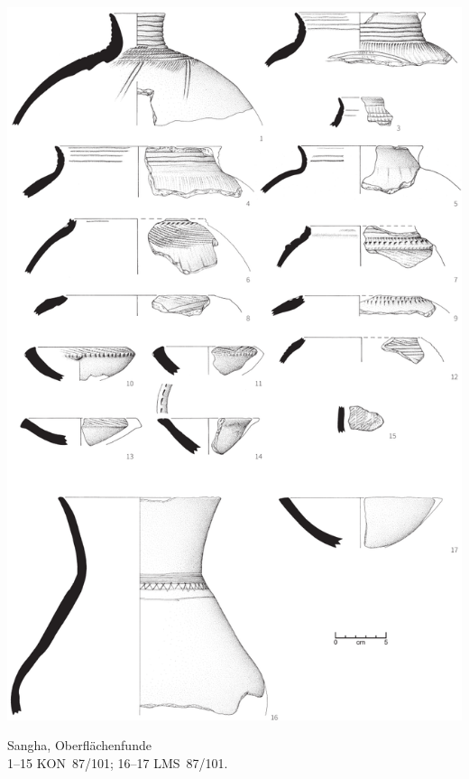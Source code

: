 \begin{pl}[H]
	\includegraphics{plt/Taf61.pdf}
	\vspace{.75em}\caption{\mbox{Sangha}, Oberflächenfunde \\ 1--15 KON~87/101; 16--17 LMS~87/101.}
	\label{pl:61}
\end{pl}

